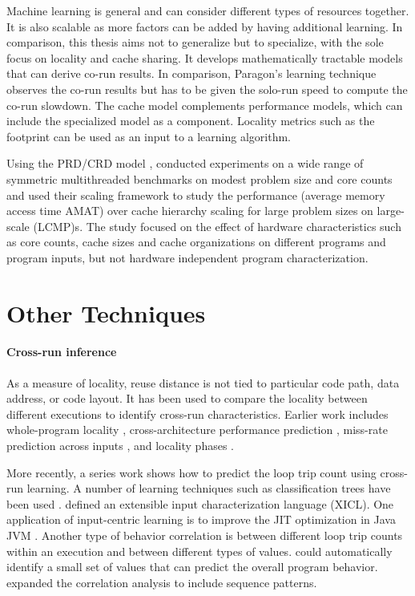 Machine learning is general and can consider different types of
resources together.  It is also scalable as more factors can be added
by having additional learning.  In comparison, this thesis aims not to
generalize but to specialize, with the sole focus on locality and cache
sharing.  It develops mathematically tractable models that can derive
co-run results.  In comparison, Paragon's learning technique observes
the co-run results but has to be given the solo-run speed to compute
the co-run slowdown.  The cache model complements performance models,
which can include the specialized model as a component.  Locality
metrics such as the footprint can be used as an input to a learning
algorithm.



Using the PRD/CRD model \citep{WuY:PACT11}, \citet{Wu+:ISCA13}
conducted experiments on a wide range of symmetric multithreaded
benchmarks on modest problem size and core counts and used their
scaling framework to study the performance (average memory access time
AMAT) over cache hierarchy scaling for large problem sizes on
large-scale (LCMP)s.  The study focused on the effect of hardware
characteristics such as core counts, cache sizes and cache
organizations on different programs and program inputs, but not
hardware independent program characterization.


\section{Other Techniques}

\paragraph{Cross-run inference}

As a measure of locality, reuse distance is not tied to particular
code path, data address, or code layout.  It has been used to compare
the locality between different executions to identify cross-run
characteristics.  Earlier work includes whole-program
locality \citep{Zhong+:TOPLAS09,DingZ:PLDI03,Shen+:LACSI03}, 
cross-architecture performance
prediction \citep{MarinM:SIGMETRICS04,MarinM:LACSI05},
miss-rate prediction across inputs \citep{Zhong+:TOC07},
and locality phases \citep{ShenD:LCPC05,Shen+:ASPLOS04,Shen+:JPDC07}.

More recently, a series work shows how to predict the loop trip count
using cross-run learning.  A number of learning techniques such as 
classification trees have been used \citep{CavazosM:PLDI04,MaoS:CGO09}.
\citet{MaoS:CGO09} defined an extensible 
input characterization language (XICL).  One application 
of input-centric learning is to improve the JIT optimization in Java
JVM \citep{Arnold+:OOPSLA05,Tian+:OOPSLA10,Tian+:OOPSLA11}.
Another type of behavior correlation is between
different loop trip counts within an execution and between different
types of values.  \citet{Jiang+:CGO10} could automatically identify
a small set of values that can predict the overall program behavior.
\citet{Wu+:OOPSLA12} expanded the correlation analysis to include
sequence patterns.  

